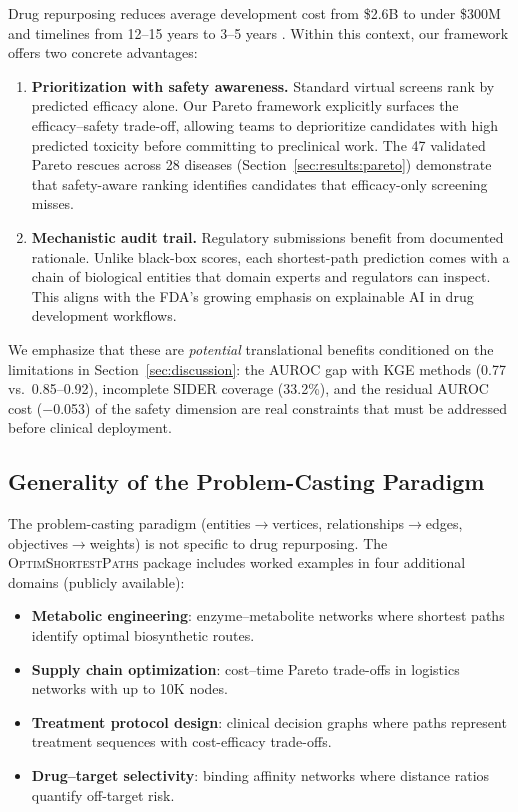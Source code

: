 \documentclass[11pt,a4paper]{article}
\newcommand{\optim}{\textsc{OptimShortestPaths}}
\begin{document}
Drug repurposing reduces average development cost from \$2.6B to
under \$300M and timelines from 12--15 years to 3--5 years
\citep{pushpakom2019drug, ashburn2004drug}.  Within this context,
our framework offers two concrete advantages:

\begin{enumerate}
    \item \textbf{Prioritization with safety awareness.}  Standard
    virtual screens rank by predicted efficacy alone.  Our Pareto
    framework explicitly surfaces the efficacy--safety trade-off,
    allowing teams to deprioritize candidates with high predicted
    toxicity before committing to preclinical work.  The 47 validated
    Pareto rescues across 28 diseases (Section~\ref{sec:results:pareto})
    demonstrate that safety-aware ranking identifies candidates that
    efficacy-only screening misses.

    \item \textbf{Mechanistic audit trail.}  Regulatory submissions
    benefit from documented rationale.  Unlike black-box scores,
    each shortest-path prediction comes with a chain of biological
    entities that domain experts and regulators can inspect.
    This aligns with the FDA's growing emphasis on explainable AI
    in drug development workflows.
\end{enumerate}

We emphasize that these are \emph{potential} translational benefits
conditioned on the limitations in Section~\ref{sec:discussion}:
the AUROC gap with KGE methods (0.77 vs.\ 0.85--0.92), incomplete
SIDER coverage (33.2\%), and the residual AUROC cost ($-$0.053) of
the safety dimension are real constraints that must be addressed
before clinical deployment.

\subsection{Generality of the Problem-Casting Paradigm}
\label{sec:impact:generality}

The problem-casting paradigm (entities$\to$vertices,
relationships$\to$edges, objectives$\to$weights) is not specific to
drug repurposing.  The \optim{} package includes worked examples in
four additional domains (publicly available):

\begin{itemize}
    \item \textbf{Metabolic engineering}: enzyme--metabolite networks
    where shortest paths identify optimal biosynthetic routes.
    \item \textbf{Supply chain optimization}: cost--time Pareto
    trade-offs in logistics networks with up to 10K nodes.
    \item \textbf{Treatment protocol design}: clinical decision
    graphs where paths represent treatment sequences with
    cost-efficacy trade-offs.
    \item \textbf{Drug--target selectivity}: binding affinity networks
    where distance ratios quantify off-target risk.
\end{itemize}
\end{document}
